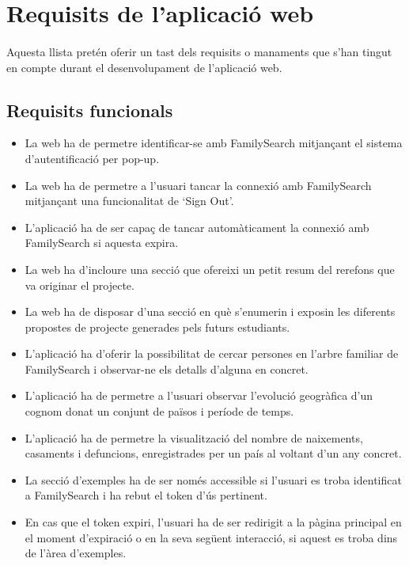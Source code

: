 \section{Requisits de l'aplicació web}\label{sec:requisits}

    \paragraph{}
    Aquesta llista pretén oferir un tast dels requisits o manaments que s'han tingut en compte durant el desenvolupament de l'aplicació web.

    \subsection{Requisits funcionals}

    \begin{itemize}
        \item La web ha de permetre identificar-se amb FamilySearch mitjançant el sistema d'autentificació per pop-up.
        \item La web ha de permetre a l'usuari tancar la connexió amb FamilySearch mitjançant una funcionalitat de `Sign Out'.
        \item L'aplicació ha de ser capaç de tancar automàticament la connexió amb Family\-Search si aquesta expira.
        \item La web ha d'incloure una secció que ofereixi un petit resum del rerefons que va originar el projecte.
        \item La web ha de disposar d'una secció en què s'enumerin i exposin les diferents propostes de projecte generades pels futurs estudiants.
        \item L'aplicació ha d'oferir la possibilitat de cercar persones en l'arbre familiar de FamilySearch i observar-ne els detalls d'alguna en concret.
        \item L'aplicació ha de permetre a l'usuari observar l'evolució geogràfica d'un cognom donat un conjunt de països i període de temps.
        \item L'aplicació ha de permetre la visualització del nombre de naixements, casaments i defuncions, enregistrades per un país al voltant d'un any concret.
        \item La secció d'exemples ha de ser només accessible si l'usuari es troba identificat a FamilySearch i ha rebut el token d'ús pertinent.
        \item En cas que el token expiri, l'usuari ha de ser redirigit a la pàgina principal en el moment d'expiració o en la seva següent interacció, si aquest es troba dins de l'àrea d'exemples.

\end{itemize}
